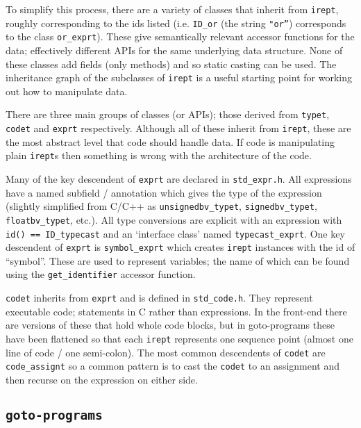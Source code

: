 \documentclass{article}
\newcommand{\file}[1]{\texttt{#1}}
\newcommand{\code}[1]{\texttt{#1}}
\begin{document}
To simplify this process, there are a variety of classes that inherit
from \code{irept}, roughly corresponding to the ids listed
(i.e. \code{ID\_or} (the string \code{"or''}) corresponds to the class
\code{or\_exprt}).  These give semantically relevant accessor
functions for the data; effectively different APIs for the same
underlying data structure.  None of these classes add fields (only
methods) and so static casting can be used.  The inheritance graph of
the subclasses of \code{irept} is a useful starting point for working
out how to manipulate data.

There are three main groups of classes (or APIs); those derived from
\code{typet}, \code{codet} and \code{exprt} respectively.  Although
all of these inherit from \code{irept}, these are the most abstract
level that code should handle data.  If code is manipulating plain
\code{irept}s then something is wrong with the architecture of the
code.

Many of the key descendent of \code{exprt} are declared in
\file{std\_expr.h}.  All expressions have a named subfield /
annotation which gives the type of the expression (slightly
simplified from C/C++ as \code{unsignedbv\_typet},
\code{signedbv\_typet}, \code{floatbv\_typet}, etc.).  All type
conversions are explicit with an expression with \code{id() ==
  ID\_typecast} and an `interface class' named
\code{typecast\_exprt}.  One key descendent of \code{exprt} is
\code{symbol\_exprt} which creates \code{irept} instances with the id
of ``symbol''.  These are used to represent variables; the name of
which can be found using the \code{get\_identifier} accessor function.


\code{codet} inherits from \code{exprt} and is defined in
\file{std\_code.h}.  They represent executable code; statements in C
rather than expressions.  In the front-end there are versions of these
that hold whole code blocks, but in goto-programs these have been
flattened so that each \code{irept} represents one sequence point
(almost one line of code / one semi-colon).  The most common
descendents of \code{codet} are \code{code\_assignt} so a common
pattern is to cast the \code{codet} to an assignment and then recurse
on the expression on either side.






\subsection{\code{goto-programs}}
\label{section:goto-programs}
\end{document}

